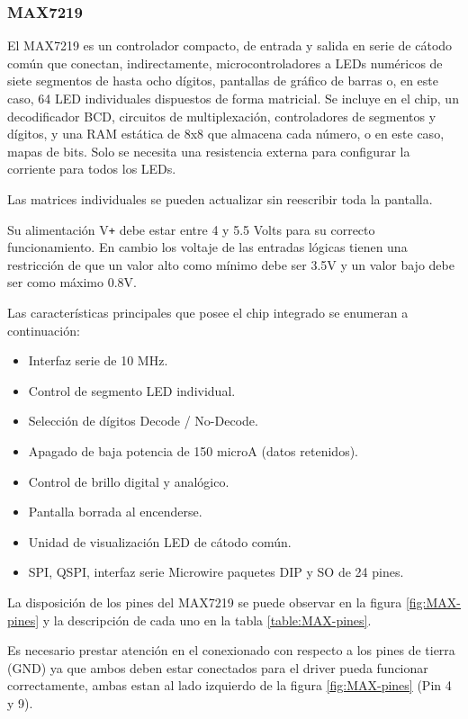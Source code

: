 \subsubsection{MAX7219}\label{sec:max7219}
El MAX7219 es un controlador compacto, de entrada y salida en serie de cátodo común que conectan, indirectamente, microcontroladores a LEDs numéricos de siete segmentos de hasta ocho dígitos, pantallas de gráfico de barras o, en este caso, 64 LED individuales dispuestos de forma matricial. Se incluye en el chip, un decodificador BCD, circuitos de multiplexación, controladores de segmentos y dígitos, y una RAM estática de 8x8 que almacena cada número, o en este caso, mapas de bits. Solo se necesita una resistencia externa para configurar la corriente para todos los LEDs.

Las matrices individuales se pueden actualizar sin reescribir toda la pantalla.

Su alimentación V\texttt{+} debe estar entre 4 y 5.5 Volts para su correcto funcionamiento. En cambio los voltaje de las entradas lógicas tienen una restricción de que un valor alto como mínimo debe ser 3.5V y un valor bajo debe ser como máximo 0.8V.

Las características principales que posee el chip integrado se enumeran a continuación:
\begin{itemize}
	\item Interfaz serie de 10 MHz.
	\item Control de segmento LED individual.
	\item Selección de dígitos Decode / No-Decode.
	\item Apagado de baja potencia de 150 microA (datos retenidos).
	\item Control de brillo digital y analógico.
	\item Pantalla borrada al encenderse.
	\item Unidad de visualización LED de cátodo común.
	\item SPI, QSPI, interfaz serie Microwire paquetes DIP y SO de 24 pines.
\end{itemize}

La disposición de los pines del MAX7219 se puede observar en la figura \ref{fig:MAX-pines} y la descripción de cada uno en la tabla \ref{table:MAX-pines}.

Es necesario prestar atención en el conexionado con respecto a los pines de tierra (GND) ya que ambos deben estar conectados para el driver pueda funcionar correctamente, ambas estan al lado izquierdo de la figura \ref{fig:MAX-pines} (Pin 4 y 9).

